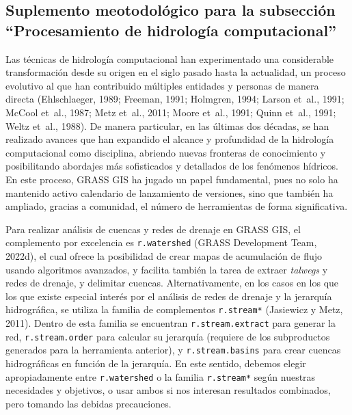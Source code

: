 \documentclass[spanish]{article}
\begin{document}
\hypertarget{suplemento-meotodoluxf3gico-para-la-subsecciuxf3n-procesamiento-de-hidrologuxeda-computacional}{%
\subsection*{Suplemento meotodológico para la subsección ``Procesamiento
de hidrología
computacional''}\label{suplemento-meotodoluxf3gico-para-la-subsecciuxf3n-procesamiento-de-hidrologuxeda-computacional}}

Las técnicas de hidrología computacional han experimentado una
considerable transformación desde su origen en el siglo pasado hasta la
actualidad, un proceso evolutivo al que han contribuido múltiples
entidades y personas de manera directa (Ehlschlaeger, 1989; Freeman,
1991; Holmgren, 1994; Larson et~al., 1991; McCool et~al., 1987; Metz
et~al., 2011; Moore et~al., 1991; Quinn et~al., 1991; Weltz et~al.,
1988). De manera particular, en las últimas dos décadas, se han
realizado avances que han expandido el alcance y profundidad de la
hidrología computacional como disciplina, abriendo nuevas fronteras de
conocimiento y posibilitando abordajes más sofisticados y detallados de
los fenómenos hídricos. En este proceso, GRASS GIS ha jugado un papel
fundamental, pues no solo ha mantenido activo calendario de lanzamiento
de versiones, sino que también ha ampliado, gracias a comunidad, el
número de herramientas de forma significativa.

Para realizar análisis de cuencas y redes de drenaje en GRASS GIS, el
complemento por excelencia es \texttt{r.watershed} (GRASS Development
Team, 2022d), el cual ofrece la posibilidad de crear mapas de
acumulación de flujo usando algoritmos avanzados, y facilita también la
tarea de extraer \emph{talwegs} y redes de drenaje, y delimitar cuencas.
Alternativamente, en los casos en los que los que existe especial
interés por el análisis de redes de drenaje y la jerarquía hidrográfica,
se utiliza la familia de complementos \texttt{r.stream*} (Jasiewicz y
Metz, 2011). Dentro de esta familia se encuentran
\texttt{r.stream.extract} para generar la red, \texttt{r.stream.order}
para calcular su jerarquía (requiere de los subproductos generados para
la herramienta anterior), y \texttt{r.stream.basins} para crear cuencas
hidrográficas en función de la jerarquía. En este sentido, debemos
elegir apropiadamente entre \texttt{r.watershed} o la familia
\texttt{r.stream*} según nuestras necesidades y objetivos, o usar ambos
si nos interesan resultados combinados, pero tomando las debidas
precauciones.
\end{document}
